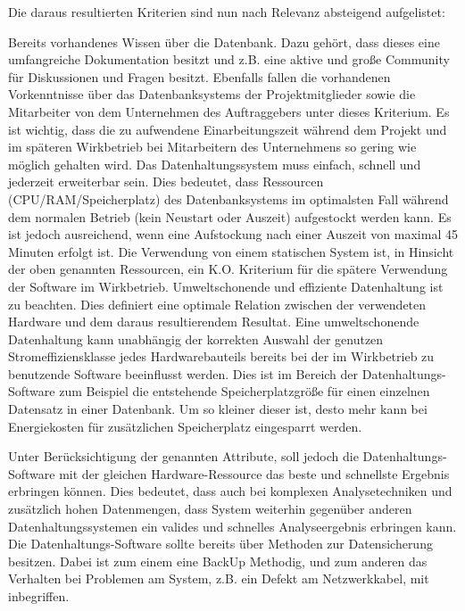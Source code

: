 Die daraus resultierten Kriterien sind nun nach Relevanz absteigend
aufgelistet: 
\begin{outline}
  \1 Bereits vorhandenes Wissen über die Datenbank. Dazu gehört,
  dass dieses eine umfangreiche Dokumentation besitzt und z.B. eine
  aktive und große Community für Diskussionen und Fragen besitzt.
  Ebenfalls fallen die vorhandenen Vorkenntnisse über das 
  Datenbanksystems der Projektmitglieder sowie die Mitarbeiter
  von dem Unternehmen des Auftraggebers unter dieses Kriterium.
  Es ist wichtig, dass die zu aufwendene Einarbeitungszeit während
  dem Projekt und im späteren Wirkbetrieb bei Mitarbeitern des 
  Unternehmens so gering wie möglich gehalten wird.
  \1 Das Datenhaltungssystem muss einfach, schnell und jederzeit
  erweiterbar sein. Dies bedeutet, dass Ressourcen
  (CPU/RAM/Speicherplatz) des Datenbanksystems im optimalsten Fall
  während dem normalen Betrieb (kein Neustart oder Auszeit)
  aufgestockt werden kann. Es ist jedoch ausreichend, wenn eine
  Aufstockung nach einer Auszeit von maximal 45 Minuten erfolgt ist.
  Die Verwendung von einem statischen System ist, in Hinsicht der oben
  genannten Ressourcen, ein K.O. Kriterium für die spätere Verwendung
  der Software im Wirkbetrieb. 
  \1 Umweltschonende und effiziente Datenhaltung ist zu beachten. 
  Dies definiert eine optimale Relation zwischen der verwendeten
  Hardware und dem daraus resultierendem Resultat. Eine
  umweltschonende Datenhaltung kann unabhängig der korrekten Auswahl
  der genutzen Stromeffiziensklasse jedes Hardwarebauteils bereits
  bei der im Wirkbetrieb zu benutzende Software beeinflusst werden.
  Dies ist im Bereich der Datenhaltungs-Software zum Beispiel die
  entstehende Speicherplatzgröße für einen einzelnen Datensatz in
  einer Datenbank. Um so kleiner dieser ist, desto mehr kann bei 
  Energiekosten für zusätzlichen Speicherplatz eingesparrt werden.
  
  Unter Berücksichtigung der genannten Attribute, soll jedoch die
  Datenhaltungs-Software mit der gleichen Hardware-Ressource das
  beste und schnellste Ergebnis erbringen können. Dies bedeutet, 
  dass auch bei komplexen Analysetechniken und zusätzlich hohen
  Datenmengen, dass System weiterhin gegenüber anderen
  Datenhaltungssystemen ein valides und schnelles Analyseergebnis
  erbringen kann.
  \1 Die Datenhaltungs-Software sollte bereits über Methoden zur 
  Datensicherung besitzen. Dabei ist zum einem eine BackUp Methodig,
  und zum anderen das Verhalten bei Problemen am System, z.B.
  ein Defekt am Netzwerkkabel, mit inbegriffen.
\end{outline}
\nl%

